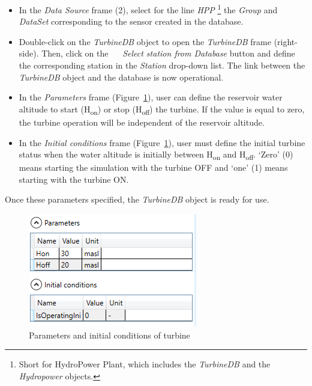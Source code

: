 \documentclass[
  letterpaper,
  DIV=11,
  numbers=noendperiod]{scrreprt}
\begin{document}
\begin{itemize}
\item
  {In the \emph{Data Source} frame (2), select for the line \emph{HPP}
  \footnote{Short for HydroPower Plant, which includes the
    \emph{TurbineDB} and the \emph{Hydropower} objects.} the
  \emph{Group} and \emph{DataSet} corresponding to the sensor created in
  the database.}
\item
  {Double-click on the \emph{TurbineDB} object to open the
  \emph{TurbineDB} frame (right-side). Then, click on the
  \includegraphics[width=0.15in,height=0in]{./figures/fig-icon_arrow_down_menu.png}
  \emph{Select station from Database} button and define the
  corresponding station in the \emph{Station} drop-down list. The link
  between the \emph{TurbineDB} object and the database is now
  operational.}
\item
  {In the \emph{Parameters} frame (Figure~\ref{fig-param_ic_turbine}),
  user can define the reservoir water altitude to start
  (H\textsubscript{on}) or stop (H\textsubscript{off}) the turbine. If
  the value is equal to zero, the turbine operation will be independent
  of the reservoir altitude.}
\item
  {In the \emph{Initial conditions} frame
  (Figure~\ref{fig-param_ic_turbine}), user must define the initial
  turbine status when the water altitude is initially between
  H\textsubscript{on} and H\textsubscript{off}. `Zero' (0) means
  starting the simulation with the turbine OFF and `one' (1) means
  starting with the turbine ON.}
\end{itemize}

Once these parameters specified, the \emph{TurbineDB} object is ready
for use.

\begin{figure}

{\centering \includegraphics{./figures/fig-param_ic_turbine.png}

}

\caption{\label{fig-param_ic_turbine}Parameters and initial conditions
of turbine}

\end{figure}
\end{document}

